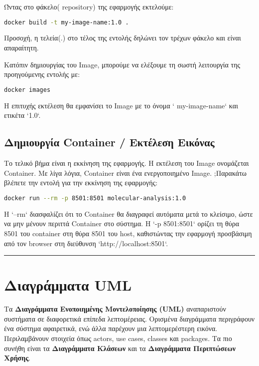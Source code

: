 \documentclass{article}  %
\begin{document}
Ώντας στο φάκελο( {repository}) της εφαρμογής εκτελούμε:

\begin{lstlisting}[language=bash]
    docker build -t my-image-name:1.0 .
\end{lstlisting}


Προσοχή, η τελεία(.) στο τέλος της εντολής δηλώνει τον τρέχων φάκελο και είναι απαραίτητη.

Κατόπιν δημιουργίας του  {Image}, μπορούμε να ελέξουμε τη σωστή λειτουργία της προηγούμενης εντολής με:

\begin{lstlisting}[language=bash]
    docker images
\end{lstlisting}

Η επιτυχής εκτέλεση θα εμφανίσει το  {Image} με το όνομα ` {my-image-name}` και ετικέτα `1.0`.


\subsection{Δημιουργία  {Container} / Εκτέλεση Εικόνας}
Το τελικό βήμα είναι η εκκίνηση της εφαρμογής. Η εκτέλεση του  {Image} ονομάζεται Container. Με λίγα λόγια,  {Container} είναι ένα ενεργοποιημένο  {Image}. ;Παρακάτω βλέπετε την εντολή για την εκκίνηση της εφαρμογής:

\begin{lstlisting}[language=bash]
    docker run --rm -p 8501:8501 molecular-analysis:1.0
\end{lstlisting}


H  {`--rm`} διασφαλίζει ότι το  {Container} θα διαγραφεί αυτόματα μετά το κλείσιμο, ώστε να μην μένουν περιττά  {Container} στο σύστημα. Η  {`-p 8501:8501`} ορίζει τη θύρα 8501 του container στη θύρα 8501 του  {host}, καθιστώντας την εφαρμογή προσβάσιμη από τον  {browser} στη διεύθυνση  {`http://localhost:8501`}.







\noindent\rule{\linewidth}{0.4pt}
\section{Διαγράμματα UML}
\label{sec:uml}

Τα \textbf{Διαγράμματα Ενοποιημένης Μοντελοποίησης (UML)} αναπαριστούν συστήματα σε διαφορετικά επίπεδα λεπτομέρειας. Ορισμένα διαγράμματα περιγράφουν ένα σύστημα αφαιρετικά, ενώ άλλα παρέχουν μια λεπτομερέστερη εικόνα. Περιλαμβάνουν στοιχεία όπως actors, use cases, classes και packages. Τα πιο συνήθη είναι τα \textbf{Διαγράμματα Κλάσεων} και τα \textbf{Διαγράμματα Περιπτώσεων Χρήσης}.
\end{document}
